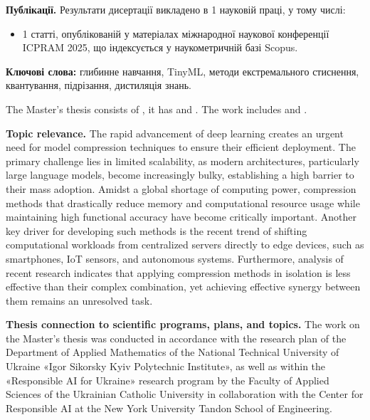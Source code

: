 \documentclass{pma-mthesis}
\begin{document}
\textbf{Публікації.} Результати дисертації викладено в 1 науковій праці, у тому числі:
\begin{itemize}[label=--, partopsep=0pt, parsep=0pt, topsep=0pt, itemsep=0pt, itemindent=1.7cm, leftmargin=0pt]
    \item 1 статті, опублікованій у матеріалах міжнародної наукової конференції ICPRAM 2025, що індексується у наукометричній базі Scopus.
\end{itemize}

\textbf{Ключові слова:} глибинне навчання, TinyML, методи екстремального стиснення, квантування, підрізання, дистиляція знань. 

The Master’s thesis consists of , it has  and . The work includes  and .

\textbf{Topic relevance.} The rapid advancement of deep learning creates an urgent need for model compression techniques to ensure their efficient deployment. The primary challenge lies in limited scalability, as modern architectures, particularly large language models, become increasingly bulky, establishing a high barrier to their mass adoption. Amidst a global shortage of computing power, compression methods that drastically reduce memory and computational resource usage while maintaining high functional accuracy have become critically important. Another key driver for developing such methods is the recent trend of shifting computational workloads from centralized servers directly to edge devices, such as smartphones, IoT sensors, and autonomous systems. Furthermore, analysis of recent research indicates that applying compression methods in isolation is less effective than their complex combination, yet achieving effective synergy between them remains an unresolved task.

\textbf{Thesis connection to scientific programs, plans, and topics.} The work on the Master's thesis was conducted in accordance with the research plan of the Department of Applied Mathematics of the National Technical University of Ukraine «Igor Sikorsky Kyiv Polytechnic Institute», as well as within the «Responsible AI for Ukraine» research program by the Faculty of Applied Sciences of the Ukrainian Catholic University in collaboration with the Center for Responsible AI at the New York University Tandon School of Engineering.
\end{document}
